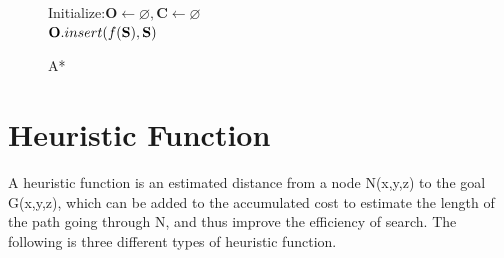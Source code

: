\documentclass[conference]{IEEEtran}
\makeatletter
\newcommand{\removelatexerror}{\let\@latex@error\@gobble}
\makeatother
\begin{document}
\begin{figure}[ht]
	\removelatexerror
	\begin{algorithm}[H]
		\caption{A*}
		\LinesNumbered
		Initialize:$ \textbf{O}\leftarrow \varnothing, \textbf{C}\leftarrow \varnothing $\\
		$ \textbf{O}.insert(f(\bf S),\bf S) $\\
		
		
	\end{algorithm}
\end{figure}

\section{Heuristic Function}
A heuristic function is an estimated distance from a node N(x,y,z) to the goal G(x,y,z), which can be added to the accumulated cost to estimate the length of the path going through N, and thus improve the efficiency of search. The following is three different types of heuristic function.
\end{document}
